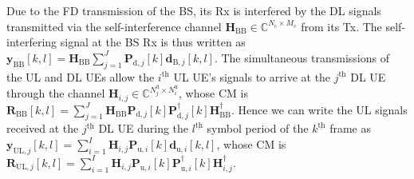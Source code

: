 \documentclass[9pt,journal]{IEEEtran}
\newcommand{\bracket}[1]{{\left [{#1}\right ]}}
\newcommand{\braces}[1]{{\left\{ {#1}\right\}}}
\newcommand{\ith}[1]    {{#1}^{\underline{\text{th}}}}
\newcommand{\cc}{_\mathrm{c}}
\newcommand{\dui}{\mathbf{d}_{\textrm{u},i}\bracket{k,l}}
\newcommand{\PiB}{\mathbf{P}_{\textrm{u},i}\bracket{k}}
\newcommand{\PiBH}{\mathbf{P}^\dagger_{\textrm{u},i}\bracket{k}}
\newcommand{\PBj}{\mathbf{P}_{\textrm{d},j}\bracket{k}}
\newcommand{\PBjH}{\mathbf{P}^\dagger_{\textrm{d},j}\bracket{k}}
\theoremstyle{definition}
\begin{document}
Due to the FD transmission of the BS, its Rx is interfered by the DL signals transmitted via the self-interference channel $\mathbf{H}_{\mathrm{BB}}\in{\mathbb{C}^{\mathit{N}\cc\times \mathit{M}\cc}}$ from its Tx. The self-interfering signal at the BS Rx is thus written as 
$\mathbf{y}_{\mathrm{BB}}\bracket{k,l}=\mathbf{H}_{\mathrm{BB}}\sum_{j=1}^{\mathit{J}}\PBj\mathbf{d}_{\textrm{B},j}\bracket{k,l}$. The simultaneous transmissions of the UL and DL UEs allow the $\ith{i}$ UL UE's signals to arrive at the $\ith{j}$ DL UE through the channel $\mathbf{H}_{i,j}\in\mathbb{C}^{\mathit{N}^{\textrm{d}}_j\times \mathit{N}^{\textrm{u}}_i}$, whose CM is $\mathbf{R}_{\mathrm{BB}}\bracket{k,l}=\sum_{j=1}^{\mathit{J}}\mathbf{H}_{\mathrm{BB}}\PBj\PBjH\mathbf{H}^\dagger_\mathrm{BB}$.
Hence we can write the UL signals received at the $\ith{j}$ DL UE during the $\ith{l}$ symbol period of the $\ith{k}$ frame as $\mathbf{y}_{\mathrm{UL},j}\bracket{k,l}=\sum_{i=1}^{\mathit{I}}\mathbf{H}_{i,j}\PiB\dui$, whose CM is $\mathbf{R}_{\mathrm{UL},j}\bracket{k,l}=\sum_{i=1}^{\mathit{I}}\mathbf{H}_{i,j}\PiB\PiBH\mathbf{H}^\dagger_{i,j}$. 
\end{document}
